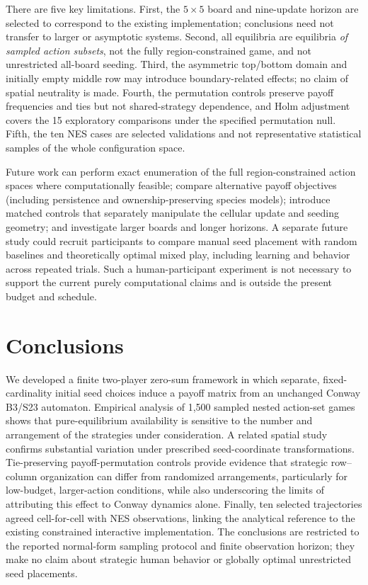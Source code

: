 \documentclass[games,article,submit,moreauthors]{Definitions/mdpi}
\begin{document}
There are five key limitations. First, the $5\times5$ board and nine-update horizon are selected to correspond to the existing implementation; conclusions need not transfer to larger or asymptotic systems. Second, all equilibria are equilibria \emph{of sampled action subsets}, not the fully region-constrained game, and not unrestricted all-board seeding. Third, the asymmetric top/bottom domain and initially empty middle row may introduce boundary-related effects; no claim of spatial neutrality is made. Fourth, the permutation controls preserve payoff frequencies and ties but not shared-strategy dependence, and Holm adjustment covers the 15 exploratory comparisons under the specified permutation null. Fifth, the ten NES cases are selected validations and not representative statistical samples of the whole configuration space.

Future work can perform exact enumeration of the full region-constrained action spaces where computationally feasible; compare alternative payoff objectives (including persistence and ownership-preserving species models); introduce matched controls that separately manipulate the cellular update and seeding geometry; and investigate larger boards and longer horizons. A separate future study could recruit participants to compare manual seed placement with random baselines and theoretically optimal mixed play, including learning and behavior across repeated trials. Such a human-participant experiment is not necessary to support the current purely computational claims and is outside the present budget and schedule.

\section{Conclusions}\label{sec:conclusion}

We developed a finite two-player zero-sum framework in which separate, fixed-cardinality initial seed choices induce a payoff matrix from an unchanged Conway B3/S23 automaton. Empirical analysis of 1,500 sampled nested action-set games shows that pure-equilibrium availability is sensitive to the number and arrangement of the strategies under consideration. A related spatial study confirms substantial variation under prescribed seed-coordinate transformations. Tie-preserving payoff-permutation controls provide evidence that strategic row--column organization can differ from randomized arrangements, particularly for low-budget, larger-action conditions, while also underscoring the limits of attributing this effect to Conway dynamics alone. Finally, ten selected trajectories agreed cell-for-cell with NES observations, linking the analytical reference to the existing constrained interactive implementation. The conclusions are restricted to the reported normal-form sampling protocol and finite observation horizon; they make no claim about strategic human behavior or globally optimal unrestricted seed placements.
\end{document}
